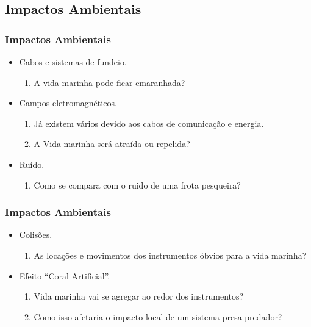 \subsection{Impactos Ambientais}
\begin{frame}
    \frametitle{Impactos Ambientais}
    \small{
    \begin{itemize}[<+-| alert@+>]
        \item Cabos e sistemas de fundeio.
            \begin{enumerate}[<+-| alert@+>]
                \item[] A vida marinha pode ficar emaranhada?
            \end{enumerate}
        \item Campos eletromagnéticos.
            \begin{enumerate}[<+-| alert@+>]
                \item[] Já existem vários devido aos cabos de comunicação e
                        energia.
                \item[] A Vida marinha será atraída ou repelida?
            \end{enumerate}
        \item Ruído.
            \begin{enumerate}[<+-| alert@+>]
                \item[] Como se compara com o ruido de uma frota pesqueira?
            \end{enumerate}
    \end{itemize}
    }
\end{frame}

\begin{frame}
    \frametitle{Impactos Ambientais}
    \small{
    \begin{itemize}[<+-| alert@+>]
        \item Colisões.
            \begin{enumerate}[<+-| alert@+>]
                \item[] As locações e movimentos dos instrumentos óbvios para
                        a vida marinha?
            \end{enumerate}
        \item Efeito ``Coral Artificial''.
            \begin{enumerate}[<+-| alert@+>]
                \item[] Vida marinha vai se agregar ao redor dos instrumentos?
                \item[] Como isso afetaria o impacto local de um sistema
                        presa-predador?
            \end{enumerate}
    \end{itemize}
    }
\end{frame}

